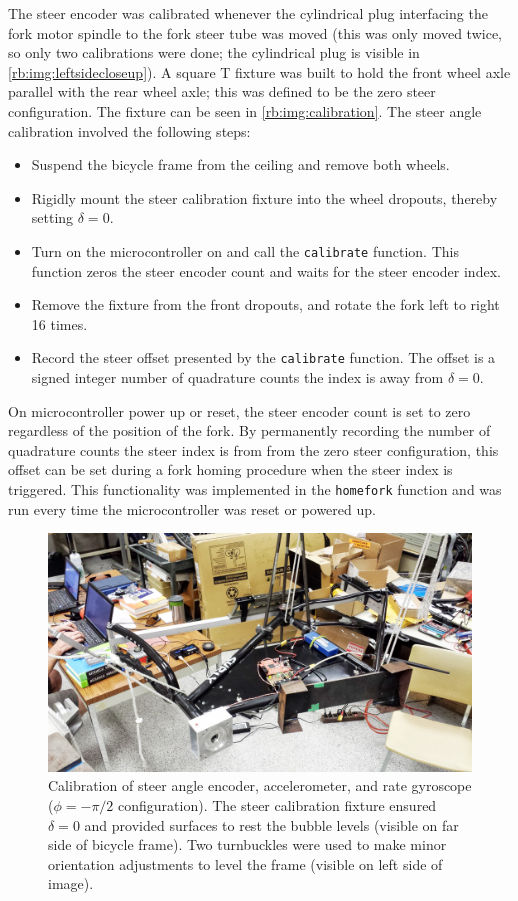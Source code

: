 The steer encoder was calibrated whenever the cylindrical plug interfacing the
fork motor spindle to the fork steer tube was moved (this was only moved twice,
so only two calibrations were done; the cylindrical plug is visible in
\autoref{rb:img:leftsidecloseup}). A square T fixture was built to hold the
front wheel axle parallel with the rear wheel axle; this was defined to be the
zero steer configuration. The fixture can be seen in
\autoref{rb:img:calibration}. The steer angle calibration involved the
following steps:
\begin{itemize}
  \item Suspend the bicycle frame from the ceiling and remove both wheels.
  \item Rigidly mount the steer calibration fixture into the wheel dropouts,
    thereby setting $\delta=0$.
  \item Turn on the microcontroller on and call the \verb|calibrate| function.
    This function zeros the steer encoder count and waits for the steer encoder
    index.
  \item Remove the fixture from the front dropouts, and rotate the fork left to
    right 16 times.
  \item Record the steer offset presented by the \verb|calibrate| function. The
    offset is a signed integer number of quadrature counts the index is away
    from $\delta=0$.
\end{itemize}
On microcontroller power up or reset, the steer encoder count is set to zero
regardless of the position of the fork. By permanently recording the number of
quadrature counts the steer index is from from the zero steer configuration,
this offset can be set during a fork homing procedure when the steer index is
triggered.  This functionality was implemented in the \verb|homefork| function
and was run every time the microcontroller was reset or powered up.

\begin{figure}[htbp]
  \centering
  \includegraphics[width=\textwidth]{images/20130711_163732_2.jpg}
  \caption{Calibration of steer angle encoder, accelerometer, and rate
    gyroscope ($\phi=-\pi/2$ configuration). The steer calibration fixture
    ensured $\delta=0$ and provided surfaces to rest the bubble levels (visible
    on far side of bicycle frame). Two turnbuckles were used to make minor
  orientation adjustments to level the frame (visible on left side of image).}
  \label{rb:img:calibration}
\end{figure}

